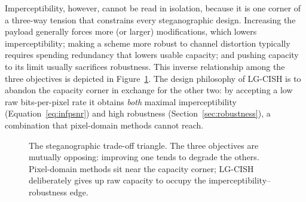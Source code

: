 \documentclass[10pt,a4paper]{article}
\theoremstyle{definition}
\begin{document}
Imperceptibility, however, cannot be read in isolation, because it is one corner of
a three-way tension that constrains every steganographic design. Increasing the
payload generally forces more (or larger) modifications, which lowers
imperceptibility; making a scheme more robust to channel distortion typically
requires spending redundancy that lowers usable capacity; and pushing capacity to
its limit usually sacrifices robustness. This inverse relationship among the three
objectives is depicted in Figure~\ref{fig:tradeoff}. The design philosophy of
LG-CISH is to abandon the capacity corner in exchange for the other two: by
accepting a low raw bits-per-pixel rate it obtains \emph{both} maximal
imperceptibility (Equation~\eqref{eq:infpsnr}) and high robustness
(Section~\ref{sec:robustness}), a combination that pixel-domain methods cannot reach.

\begin{figure}[t]
\centering
{}
\caption{The steganographic trade-off triangle. The three objectives are mutually
opposing: improving one tends to degrade the others. Pixel-domain methods sit near
the capacity corner; LG-CISH deliberately gives up raw capacity to occupy the
imperceptibility--robustness edge.}
\label{fig:tradeoff}
\end{figure}

\end{document}
